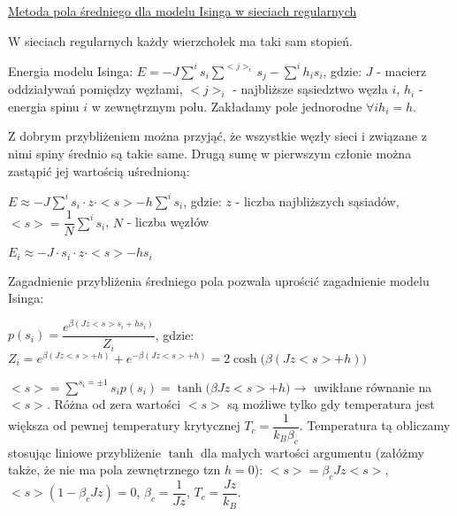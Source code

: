 \underline{Metoda pola średniego dla modelu Isinga w sieciach regularnych} 

W sieciach regularnych każdy wierzchołek ma taki sam stopień.

Energia modelu Isinga:\newline
$ E = -J\sum\limits^{i}s_i\sum\limits^{<j>_i}s_j -  \sum\limits^{i} h_i s_i $, gdzie: \newline
$ J $ - macierz oddziaływań pomiędzy węzłami,\newline
$ <j>_i $ - najbliższe sąsiedztwo węzła $ i $,\newline
$ h_i $ - energia spinu $ i $ w zewnętrznym polu. Zakładamy pole jednorodne $ \forall i h_i = h $.

Z dobrym przybliżeniem można przyjąć, że wszystkie węzły sieci i związane z nimi spiny średnio są takie same. Drugą sumę w pierwszym członie można zastąpić jej wartością uśrednioną:\newline

$ E \approx -J \sum\limits^i s_i \cdot z \cdot <s> - h \sum\limits^{i} s_i $, gdzie:\newline
$ z $ - liczba najbliższych sąsiadów, \newline
$ <s> = \dfrac{1}{N} \sum\limits^i s_i $, \newline
$ N $ - liczba węzłów

$ E_i \approx -J \cdot s_i \cdot z \cdot <s> - h s_i $

Zagadnienie przybliżenia średniego pola pozwala uprościć zagadnienie modelu Isinga:

$ p(s_i) = \dfrac{e^{\beta( J z <s> s_i + hs_i)}}{Z_i} $, gdzie: \newline
$ Z_i = e^{\beta( J z <s> + h)} + e^{-\beta( J z <s> + h)} = 2 \cosh \big(\beta (J z <s> + h)\big) $

$ <s> = \sum\limits^{s_i =\pm 1} s_i p(s_i) = \tanh \big(\beta J z <s> + h\big) \rightarrow $ uwikłane równanie na $ <s> $. Różna od zera wartości $ <s> $ są możliwe tylko gdy temperatura jest większa od pewnej temperatury krytycznej $ T_c = \dfrac{1}{k_B \beta_c} $. Temperatura tą obliczamy stosując liniowe przybliżenie $ \tanh $ dla małych wartości argumentu (załóżmy także, że nie ma pola zewnętrznego tzn $ h = 0 $):\newline
$ <s> = \beta_c J z <s> $,\newline
$ <s>(1 -\beta_c J z) = 0 $,\newline
$ \beta_c = \dfrac{1}{J z} $, \newline
$ T_c = \dfrac{J z}{k_B} $.

